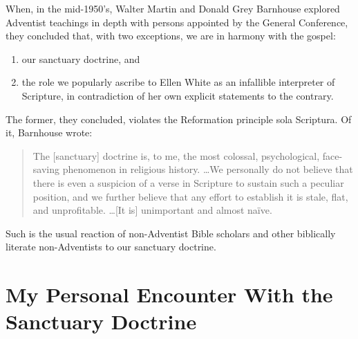 When, in the mid-1950's, Walter Martin and Donald Grey Barnhouse explored
Adventist teachings in depth with persons appointed by the General
Conference, they concluded that, with two exceptions, we are in harmony with
the gospel:
\begin{enumerate}
    \item our sanctuary doctrine, and 
    \item the role we popularly
ascribe to Ellen White as an infallible interpreter of Scripture, in
contradiction of her own explicit statements to the contrary.
\end{enumerate}
The former,
they concluded, violates the Reformation principle sola
Scriptura. Of it, Barnhouse wrote: 
\begin{quote}
The [sanctuary] doctrine is, to me, the most colossal,
psychological, face-saving phenomenon in religious history. \ldots We
personally do not believe that there is even a suspicion of a verse in
Scripture to sustain such a peculiar position, and we further believe that
any effort to establish it is stale, flat, and unprofitable. \ldots [It is]
unimportant and almost naïve.\cite{33} 
\end{quote}

\newpage
Such is the usual reaction of non-Adventist Bible scholars and other
biblically literate non-Adventists to our sanctuary doctrine.

\chapter{My Personal Encounter With the Sanctuary Doctrine}
\label{ch:personal}

